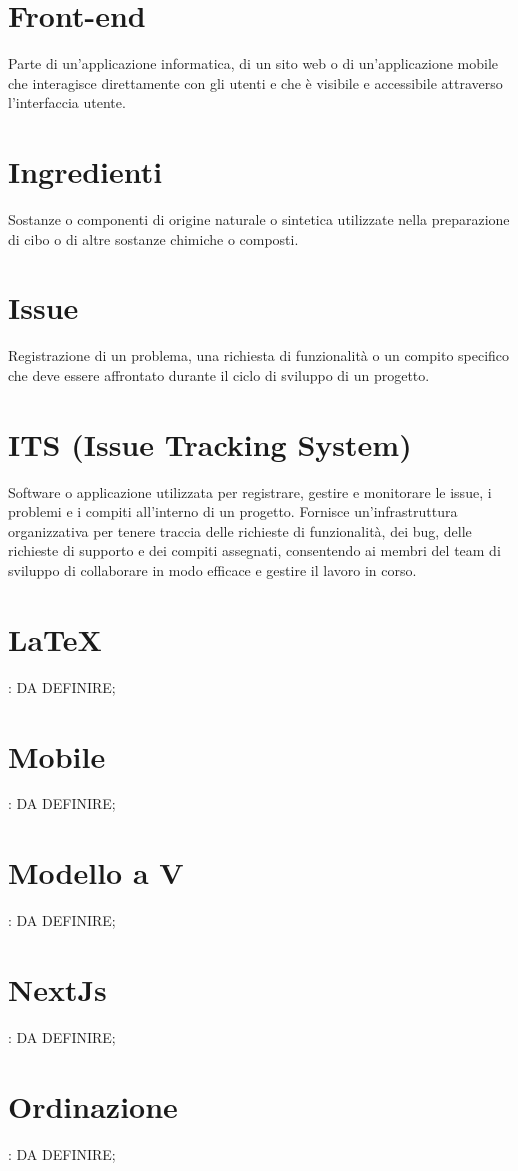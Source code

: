\section{Front-end}
Parte di un'applicazione informatica, di un sito web o di un'applicazione mobile che interagisce direttamente con gli utenti e che è visibile e accessibile attraverso l'interfaccia utente.

\section{Ingredienti}
Sostanze o componenti di origine naturale o sintetica utilizzate nella preparazione di cibo o di altre sostanze chimiche o composti.

\section{Issue}
Registrazione di un problema, una richiesta di funzionalità o un compito specifico che deve essere affrontato durante il ciclo di sviluppo di un progetto.

\section{ITS (Issue Tracking System)}
Software o applicazione utilizzata per registrare, gestire e monitorare le issue, i problemi e i compiti all'interno di un progetto. Fornisce un'infrastruttura organizzativa per tenere traccia delle richieste di funzionalità, dei bug, delle richieste di supporto e dei compiti assegnati, consentendo ai membri del team di sviluppo di collaborare in modo efficace e gestire il lavoro in corso.

\section{LaTeX}: DA DEFINIRE;
\section{Mobile}: DA DEFINIRE;
\section{Modello a V}: DA DEFINIRE;
\section{NextJs}: DA DEFINIRE;
\section{Ordinazione}: DA DEFINIRE;
